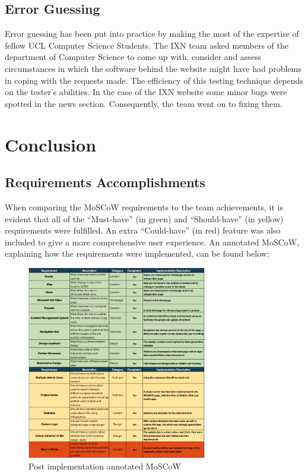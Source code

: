 \documentclass[fontsize=10pt]{extarticle}
\numberwithin{figure}{section} %
\begin{document}
\hypertarget{error-guessing}{%
\subsection{Error Guessing}\label{error-guessing}}

Error guessing has been put into practice by making the most of the
expertise of fellow UCL Computer Science Students. The IXN team asked
members of the department of Computer Science to come up with, consider
and assess circumstances in which the software behind the website might
have had problems in coping with the requests made. The efficiency of
this testing technique depends on the tester's abilities. In the case of
the IXN website some minor bugs were spotted in the news section.
Consequently, the team went on to fixing them.

\hypertarget{conclusion}{%
\section{Conclusion}\label{conclusion}}

\hypertarget{requirements-accomplishments}{%
\subsection{Requirements
Accomplishments}\label{requirements-accomplishments}}

When comparing the MoSCoW requirements to the team achievements, it is
evident that all of the ``Must-have'' (in green) and ``Should-have'' (in
yellow) requirements were fulfilled. An extra ``Could-have'' (in red)
feature was also included to give a more comprehensive user experience.
An annotated MoSCoW, explaining how the requirements were implemented,
can be found below:

\begin{figure}[H]
      \centering
      \includegraphics[trim = 0 0 0 0, clip, width=0.7\textwidth]{ph5.png}
      \caption{Post implementation annotated MoSCoW}
 \end{figure}
\end{document}
